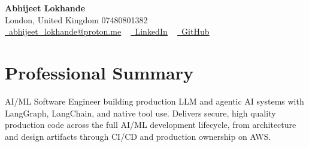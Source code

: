 \documentclass[a4paper,10pt]{article}
\begin{document}
    \begin{center}
        {\Huge\bfseries Abhijeet Lokhande}
        \\[2pt] {\color{muted}London, United Kingdom \textbar{} 07480801382}\\
        \small
        \href{mailto:abhijeet_lokhande@proton.me}{\raisebox{-0.2\height}{\color{primary}\faEnvelope}\  \underline{abhijeet\_lokhande@proton.me}} ~
        \href{https://www.linkedin.com/in/ablds/}{\raisebox{-0.2\height}{\color{primary}\faLinkedin}\ \underline{LinkedIn}}  ~
        \href{https://github.com/abhijeetscode}{\raisebox{-0.2\height}{\color{primary}\faGithub}\ \underline{GitHub}}
    \end{center}

\section{Professional Summary}
\vspace{-5pt}
{\color{muted}AI/ML Software Engineer building production LLM and agentic AI systems with LangGraph, LangChain, and native tool use. Delivers secure, high quality production code across the full AI/ML development lifecycle, from architecture and design artifacts through CI/CD and production ownership on AWS.}
\vspace{2pt}

\end{document}
